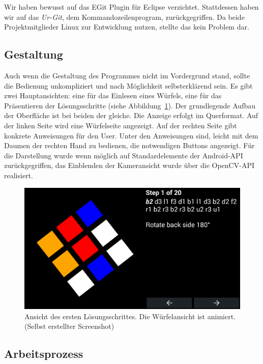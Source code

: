 Wir haben bewusst auf das EGit Plugin für Eclipse verzichtet. Stattdessen haben
wir auf das \emph{Ur-Git}, dem Kommandozeilenprogram, zurückgegriffen. Da beide
Projektmitglieder Linux zur Entwicklung nutzen, stellte das kein Problem dar.

\subsection{Gestaltung}  %

Auch wenn die Gestaltung des Programmes nicht im Vordergrund stand, sollte die
Bedienung unkompliziert und nach Möglichkeit selbsterklärend sein. Es gibt zwei
Hauptansichten: eine für das Einlesen eines Würfels, eine für das Präsentieren
der Lösungsschritte (siehe Abbildung~\ref{fig:arcs_solving}). Der grundlegende
Aufbau der Oberfläche ist bei beiden der gleiche. Die Anzeige erfolgt im
Querformat. Auf der linken Seite wird eine Würfelseite angezeigt. Auf der
rechten Seite gibt konkrete Anweisungen für den User. Unter den Anweisungen
sind, leicht mit dem Daumen der rechten Hand zu bedienen, die notwendigen
Buttons angezeigt. Für die Darstellung wurde wenn möglich auf Standardelemente
der Android-API zurückgegriffen, das Einblenden der Kameransicht wurde über die
OpenCV-API realisiert.

\begin{figure}[ht!]
  \centering
  \includegraphics[width=\textwidth]{pics/arcs_solving.png}
  \caption{Ansicht des ersten Lösungsschrittes. Die Würfelansicht ist animiert.
  (Selbst erstellter Screenshot)}
  \label{fig:arcs_solving}
\end{figure}


\subsection{Arbeitsprozess}  %

